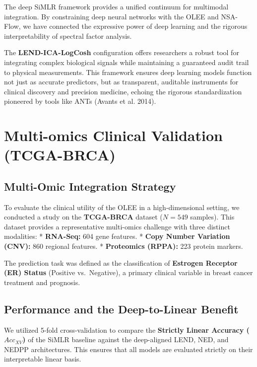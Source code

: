 \documentclass[
  letterpaper,
]{report}
\begin{document}
The deep SiMLR framework provides a unified continuum for multimodal
integration. By constraining deep neural networks with the OLEE and
NSA-Flow, we have connected the expressive power of deep learning and
the rigorous interpretability of spectral factor analysis.

The \textbf{LEND-ICA-LogCosh} configuration offers researchers a robust
tool for integrating complex biological signals while maintaining a
guaranteed audit trail to physical measurements. This framework ensures
deep learning models function not just as accurate predictors, but as
transparent, auditable instruments for clinical discovery and precision
medicine, echoing the rigorous standardization pioneered by tools like
ANTs (Avants et al. 2014).

\cleardoublepage
{}
{}
\appendix

\chapter{Multi-omics Clinical Validation
(TCGA-BRCA)}\label{multi-omics-clinical-validation-tcga-brca}

\section{Multi-Omic Integration
Strategy}\label{multi-omic-integration-strategy}

To evaluate the clinical utility of the OLEE in a high-dimensional
setting, we conducted a study on the \textbf{TCGA-BRCA} dataset
(\(N=549\) samples). This dataset provides a representative multi-omics
challenge with three distinct modalities: * \textbf{RNA-Seq:} 604 gene
features. * \textbf{Copy Number Variation (CNV):} 860 regional features.
* \textbf{Proteomics (RPPA):} 223 protein markers.

The prediction task was defined as the classification of
\textbf{Estrogen Receptor (ER) Status} (Positive vs.~Negative), a
primary clinical variable in breast cancer treatment and prognosis.

\section{Performance and the Deep-to-Linear
Benefit}\label{performance-and-the-deep-to-linear-benefit}

We utilized 5-fold cross-validation to compare the \textbf{Strictly
Linear Accuracy (\(Acc_{XV}\))} of the SiMLR baseline against the
deep-aligned LEND, NED, and NEDPP architectures. This ensures that all
models are evaluated strictly on their interpretable linear basis.
\end{document}
